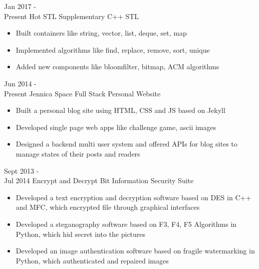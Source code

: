 \documentclass[letterpaper]{twentysecondcv} %
\begin{document}
\begin{twenty} %
	\twentyitem
	{Jan 2017 - \\Present}
	{Hot STL}
	{Supplementary C++ STL}
	{}
	{
		{\begin{itemize}
				\item Built containers like string, vector, list, deque, set, map
				\item Implemented algorithms like find, replace, remove, sort, unique
				\item Added new components like bloomfilter, bitmap, ACM algorithms
		\end{itemize}}
	}

	\twentyitem
	{Jun 2014 - \\Present}
	{Jennica Space}
	{Full Stack Personal Website}
	{}
	{
		{\begin{itemize}
				\item Built a personal blog site using HTML, CSS and JS based on Jekyll
				\item Developed single page web apps like challenge game, ascii images
				\item Designed a backend multi user system and offered APIs for blog sites to manage states of their posts and readers
		\end{itemize}}
	}

	\twentyitem
	{Sept 2013 - \\Jul 2014}
	{Encrypt and Decrypt Bit}
	{Information Security Suite}
	{}
	{
		{\begin{itemize}
				\item Developed a text encryption and decryption software based on DES in C++ and MFC, which encrypted file through graphical interfaces
				\item Developed a steganography software based on F3, F4, F5 Algorithms in Python, which hid secret into the pictures
				\item Developed an image authentication software based on fragile watermarking in Python, which authenticated and repaired images
		\end{itemize}}
	}
	
\end{twenty}


\end{document}
